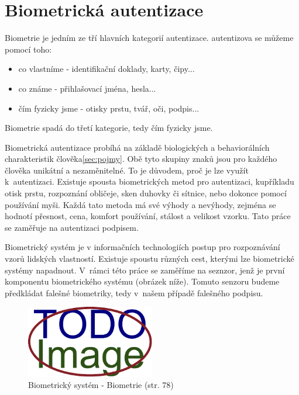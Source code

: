 \section{Biometrická autentizace}
Biometrie je jedním ze tří hlavních kategorií autentizace.
autentizova se můžeme pomocí toho:

\begin{itemize}
  \item{co vlastníme - identifikační doklady, karty, čipy...}   %
  \item{co známe - přihlašovací jména, hesla...}                %
  \item{čím fyzicky jsme - otisky prstu, tvář, oči, podpis...}  %
\end{itemize}                                                   %
Biometrie spadá do třetí kategorie, tedy čím fyzicky jsme. 

Biometrická autentizace probíhá na základě biologických a behaviorálních charakteristik člověka\ref{sec:pojmy}. 
Obě tyto skupiny znaků jsou pro každého člověka unikátní a nezaměnitelné. To je důvodem, proč je lze využít k~autentizaci.
Existuje spousta biometrických metod pro autentizaci, kupříkladu otisk prstu, rozpoznání obličeje, sken duhovky či sítnice, nebo dokonce pomocí používání myši. 
Každá tato metoda má své výhody a nevýhody, zejména se hodnotí přesnost, cena, komfort používání, stálost a velikost vzorku. %
Tato práce se zaměřuje na autentizaci podpisem.

Biometrický systém je v informačních technologiích postup pro rozpoznávání vzorů lidských vlastností.       %
Existuje spoustu různých cest, kterými lze biometrické systémy napadnout.                                   %
V~rámci této práce se zaměříme na seznzor, jenž je první komponentu biometrického systému (obrázek níže).   %
Tomuto senzoru budeme předkládat falešné biometriky, tedy v~našem případě falešného podpisu.                %

\begin{figure}[h]
  \centering
  \includegraphics[width=0.5\textwidth]{obrazky-figures/placeholder.pdf}
  \caption{Biometrický systém - Biometrie (str. 78)}
  \label{fig:my-pdf}
\end{figure}

